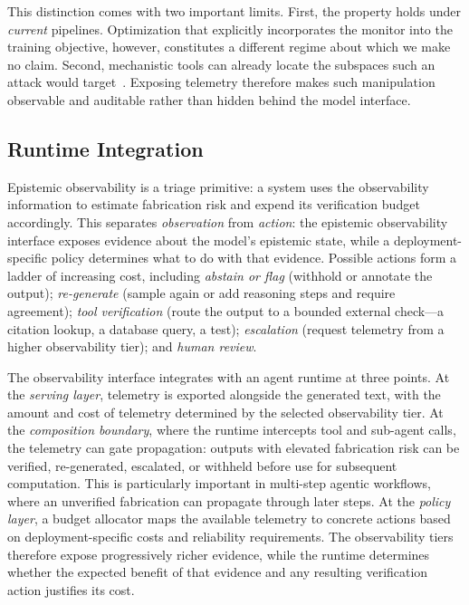 This distinction comes with two important limits. First, the property holds under \emph{current}
pipelines. Optimization that explicitly incorporates the monitor into the training objective,
however, constitutes a different regime about which we make no claim.
Second, mechanistic tools can already locate the subspaces such an attack would
target~\cite{winninger2025usingmechanisticinterpretabilitycraft}.
Exposing telemetry therefore makes such manipulation observable and
auditable rather than hidden behind the model interface.

\subsection{Runtime Integration}

Epistemic observability is a triage primitive:
a system uses the observability information to estimate
fabrication risk and expend its verification budget accordingly.
This separates \emph{observation} from \emph{action}: the epistemic
observability interface exposes evidence about the model's epistemic state,
while a deployment-specific policy determines what to do with that evidence.
Possible actions form a ladder of increasing cost, including \emph{abstain or flag} (withhold or annotate the output);
\emph{re-generate} (sample again or add reasoning steps and require agreement);
\emph{tool verification} (route the output to a bounded external check---a citation lookup, a database query, a test);
\emph{escalation} (request telemetry from a higher observability tier);
and \emph{human review}.

The observability interface integrates with an agent runtime at three points. At the
\emph{serving layer}, telemetry is exported alongside the generated text,
with the amount and cost of telemetry determined by the selected observability tier.
At the \emph{composition boundary}, where the runtime
intercepts tool and sub-agent calls, the telemetry can gate propagation: outputs with elevated
fabrication risk can be verified, re-generated, escalated, or withheld before use for subsequent computation.
This is particularly important in multi-step agentic workflows,
where an unverified fabrication can propagate through later steps.
At the \emph{policy layer}, a budget allocator maps the available
telemetry to concrete actions based on
deployment-specific costs and reliability requirements.
The observability tiers therefore expose progressively richer evidence,
while the runtime determines whether the expected benefit of that evidence
and any resulting verification action justifies its cost.

